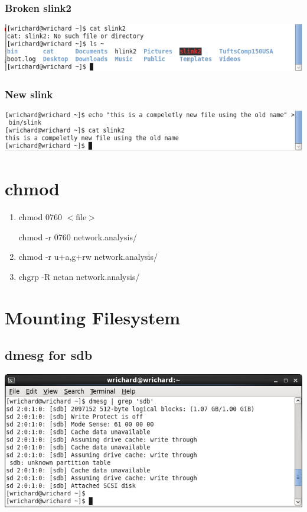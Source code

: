 \documentclass[a4paper,10pt]{article}
\begin{document}
\subsubsection{Broken slink2}
  \begin{center}
  \includegraphics[width=\linewidth]{./broken_slink2.png}
  \end{center}

\subsubsection{New slink}
  \begin{center}
  \includegraphics[width=\linewidth]{./new_slink.png}
  \end{center}

\section{chmod}
\begin{enumerate}
 \item chmod 0760 $<$file$>$

chmod -r 0760 network.analysis/
  \item chmod -r u+a,g+rw network.analysis/
  \item chgrp -R netan network.analysis/
\end{enumerate}

\section{Mounting Filesystem}
\subsection{dmesg for sdb}
  \begin{center}
  \includegraphics[width=\linewidth]{./new_drive_dmesg.png}
  \end{center}
\end{document}
